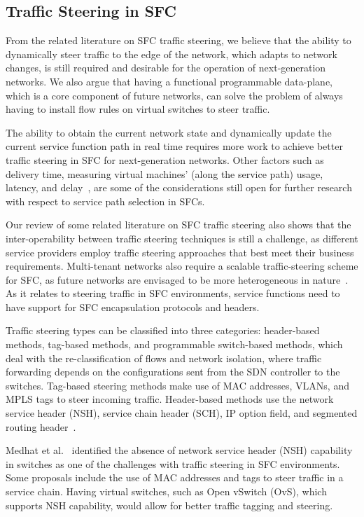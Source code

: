 \documentclass[futureinternet,review,accept,pdftex,moreauthors]{Definitions/mdpi}
\begin{document}
\subsection{Traffic Steering in SFC} 
\label{Traffic steering in SFC}
From the related literature on SFC traffic steering, we believe that the ability to dynamically steer traffic to the edge of the network, which adapts to network changes, is still required and desirable for the operation of next-generation networks. We also argue that having a functional programmable data-plane, which is a core component of future networks, can solve the problem of always having to install flow rules on virtual switches to steer traffic. 

The ability to obtain the current network state and dynamically update the current service function path in real time requires more work to achieve better traffic steering in SFC for next-generation networks. Other factors such as delivery time, measuring virtual machines’ (along the service path) usage, latency, and delay~\cite{nemeth2021delay}, are some of the considerations still open for further research with respect to service path selection in SFCs. 

Our review of some related literature on SFC traffic steering also shows that the inter-operability between traffic steering techniques is still a challenge, as different service providers employ traffic steering approaches that best meet their business requirements. Multi-tenant networks also require a scalable traffic-steering scheme for SFC, as future networks are envisaged to be more heterogeneous in nature~\cite{bouridah2021optimized}. As it relates to steering traffic in SFC environments, service functions need to have support for SFC encapsulation protocols and headers.

Traffic steering types can be classified into three categories: header-based methods, tag-based methods, and programmable switch-based methods, which deal with the re-classification of flows and network isolation, where traffic forwarding depends on the configurations sent from the SDN controller to the switches. Tag-based steering methods make use of MAC addresses, VLANs, and MPLS tags to steer incoming traffic. Header-based methods  use the network service header (NSH), service chain header (SCH), IP option field, and segmented routing header~\cite{hantouti2018traffic}. 

Medhat {et al.}~\cite{medhat2016service} identified the absence of network service header (NSH) capability in switches as one of the challenges with traffic steering in SFC environments. Some proposals include the use of MAC addresses and tags to steer traffic in a service chain. Having virtual switches, such as Open vSwitch (OvS), which supports NSH capability, would allow for better traffic tagging and steering.  
\end{document}

